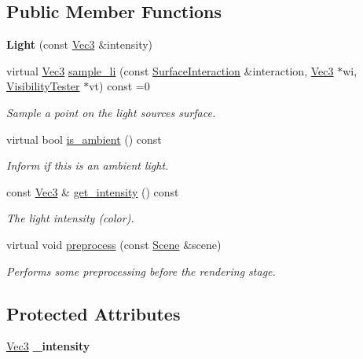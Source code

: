 \subsection*{Public Member Functions}
\begin{DoxyCompactItemize}
\item 
\mbox{\label{classomg_1_1_light_a4c27672a71952e1c7b9151bb1d661a7e}} 
{\bfseries Light} (const \mbox{\hyperlink{namespaceomg_a45a9482677fee9933ff369b49894e316}{Vec3}} \&intensity)
\item 
virtual \mbox{\hyperlink{namespaceomg_a45a9482677fee9933ff369b49894e316}{Vec3}} \mbox{\hyperlink{classomg_1_1_light_a046b7db0856d786f171979189df68037}{sample\+\_\+li}} (const \mbox{\hyperlink{classomg_1_1_surface_interaction}{Surface\+Interaction}} \&interaction, \mbox{\hyperlink{namespaceomg_a45a9482677fee9933ff369b49894e316}{Vec3}} $\ast$wi, \mbox{\hyperlink{classomg_1_1_visibility_tester}{Visibility\+Tester}} $\ast$vt) const =0
\begin{DoxyCompactList}\small\item\em Sample a point on the light source\textquotesingle{}s surface. \end{DoxyCompactList}\item 
virtual bool \mbox{\hyperlink{classomg_1_1_light_a25277f4ac404857b8895e64f28c7cb13}{is\+\_\+ambient}} () const
\begin{DoxyCompactList}\small\item\em Inform if this is an ambient light. \end{DoxyCompactList}\item 
const \mbox{\hyperlink{namespaceomg_a45a9482677fee9933ff369b49894e316}{Vec3}} \& \mbox{\hyperlink{classomg_1_1_light_a7be0cc4d0e3b3c8167ec50706abfd39b}{get\+\_\+intensity}} () const
\begin{DoxyCompactList}\small\item\em The light intensity (color). \end{DoxyCompactList}\item 
virtual void \mbox{\hyperlink{classomg_1_1_light_a8379b1dea7517c4e7fb6e0b5280c94d6}{preprocess}} (const \mbox{\hyperlink{classomg_1_1_scene}{Scene}} \&scene)
\begin{DoxyCompactList}\small\item\em Performs some preprocessing before the rendering stage. \end{DoxyCompactList}\end{DoxyCompactItemize}
\subsection*{Protected Attributes}
\begin{DoxyCompactItemize}
\item 
\mbox{\label{classomg_1_1_light_a12089e968c45e27f3dcab7054f51578f}} 
\mbox{\hyperlink{namespaceomg_a45a9482677fee9933ff369b49894e316}{Vec3}} {\bfseries \+\_\+intensity}
\end{DoxyCompactItemize}


